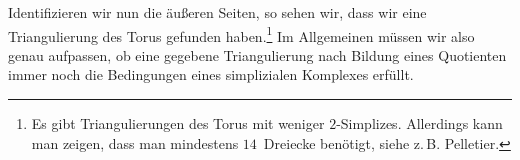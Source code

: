 \begin{thBeispiel}
\begin{center}
    \end{center}
    Identifizieren wir nun die äußeren Seiten, so sehen wir, dass wir eine
    Triangulierung des Torus gefunden haben.\footnote{%
        Es gibt Triangulierungen des Torus mit weniger $2$-Simplizes. Allerdings
        kann man zeigen, dass man mindestens $14$~Dreiecke benötigt, siehe
        z.\,B. Pelletier\cite{www:blog:rip:triangulation}.%
    }
    Im Allgemeinen müssen wir also genau aufpassen, ob eine gegebene
    Triangulierung nach Bildung eines Quotienten immer noch die Bedingungen
    eines simplizialen Komplexes erfüllt. 
\end{thBeispiel}

